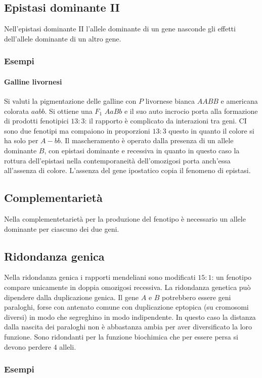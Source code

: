 \subsection{Epistasi dominante II}
Nell'epistasi dominante II l'allele dominante di un gene nasconde gli effetti dell'allele dominante di un altro gene.
\subsubsection{Esempi}
\paragraph{Galline livornesi}
Si valuti la pigmentazione delle galline con $P$ livornese bianca $AABB$ e americana colorata $aabb$. Si ottiene una $F_1$ $AaBb$ e il suo auto incrocio porta alla formazione di 
prodotti fenotipici $13:3$: il rapporto \`e complicato da interazioni tra geni. CI sono due fenotipi ma compaiono in proporzioni $13:3$ questo in quanto il colore si ha solo 
per $A-bb$. Il mascheramento \`e operato dalla presenza di un allele dominante $B$, con epistasi dominante e recessiva in quanto in questo caso la rottura dell'epistasi nella 
contemporaneit\`a dell'omozigosi porta anch'essa all'assenza di colore. L'assenza del gene ipostatico copia il fenomeno di epistasi. 
\subsection{Complementariet\`a}
Nella complementetariet\`a per la produzione del fenotipo \`e necessario un allele dominante per ciascuno dei due geni. 

\subsection{Ridondanza genica}
Nella ridondanza genica i rapporti mendeliani sono modificati $15:1$: un fenotipo compare unicamente in doppia omozigosi recessiva. La ridondanza genetica pu\`o dipendere dalla
duplicazione genica. Il gene $A$ e $B$ potrebbero essere geni paraloghi, forse con antenato comune con duplicazione eptopica (su cromosomi diversi) in modo che segreghino in modo
indipendente. In questo caso la distanza dalla nascita dei paraloghi non \`e abbastanza ambia per aver diversificato la loro funzione. Sono ridondanti per la funzione biochimica che
per essere persa si devono perdere $4$ alleli. 
\subsubsection{Esempi}
